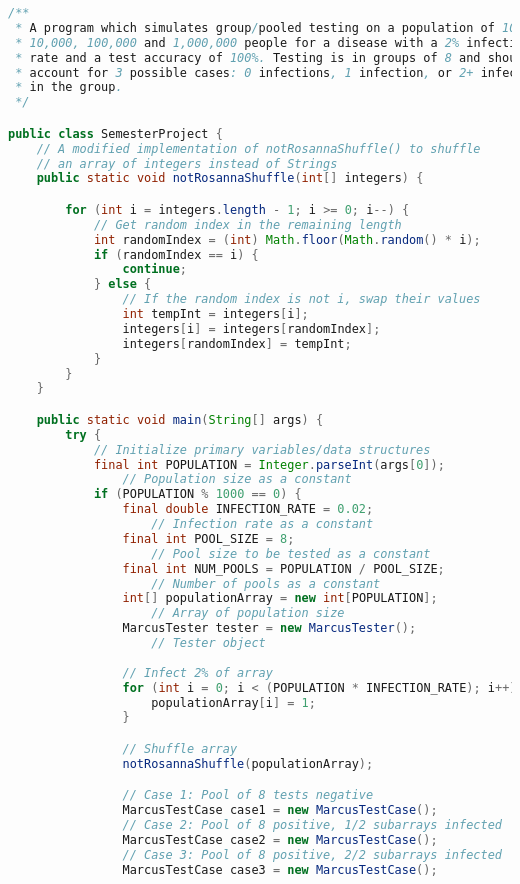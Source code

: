 \documentclass[letterpaper, 10pt]{article}
\begin{document}
\begin{lstlisting}[language=Java, firstnumber=1]
/**
 * A program which simulates group/pooled testing on a population of 1000,
 * 10,000, 100,000 and 1,000,000 people for a disease with a 2% infection
 * rate and a test accuracy of 100%. Testing is in groups of 8 and should
 * account for 3 possible cases: 0 infections, 1 infection, or 2+ infections
 * in the group.
 */

public class SemesterProject {
    // A modified implementation of notRosannaShuffle() to shuffle
    // an array of integers instead of Strings
    public static void notRosannaShuffle(int[] integers) {

        for (int i = integers.length - 1; i >= 0; i--) {
            // Get random index in the remaining length
            int randomIndex = (int) Math.floor(Math.random() * i);
            if (randomIndex == i) {
                continue;
            } else {
                // If the random index is not i, swap their values
                int tempInt = integers[i];
                integers[i] = integers[randomIndex];
                integers[randomIndex] = tempInt;
            }
        }
    }

    public static void main(String[] args) {
        try {
            // Initialize primary variables/data structures
            final int POPULATION = Integer.parseInt(args[0]);
                // Population size as a constant
            if (POPULATION % 1000 == 0) {
                final double INFECTION_RATE = 0.02;
                    // Infection rate as a constant
                final int POOL_SIZE = 8;
                    // Pool size to be tested as a constant
                final int NUM_POOLS = POPULATION / POOL_SIZE;
                    // Number of pools as a constant
                int[] populationArray = new int[POPULATION];
                    // Array of population size
                MarcusTester tester = new MarcusTester();
                    // Tester object
                
                // Infect 2% of array
                for (int i = 0; i < (POPULATION * INFECTION_RATE); i++) {
                    populationArray[i] = 1;
                }

                // Shuffle array
                notRosannaShuffle(populationArray);

                // Case 1: Pool of 8 tests negative
                MarcusTestCase case1 = new MarcusTestCase();
                // Case 2: Pool of 8 positive, 1/2 subarrays infected
                MarcusTestCase case2 = new MarcusTestCase();
                // Case 3: Pool of 8 positive, 2/2 subarrays infected
                MarcusTestCase case3 = new MarcusTestCase();


\end{lstlisting}
\end{document}
